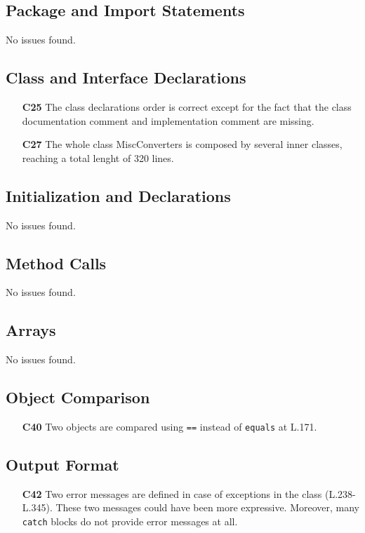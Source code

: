 \subsection{Package and Import Statements}
No issues found.

\subsection{Class and Interface Declarations}
	\begin{itemize}
		\item[\textbf{C25}] The class declarations order is correct except for the fact that the class documentation comment and implementation comment are missing.
		\item[\textbf{C27}] The whole class MiscConverters is composed by several inner classes, reaching a total lenght of 320 lines.
	\end{itemize}

\subsection{Initialization and Declarations}
No issues found.

\subsection{Method Calls}
No issues found.

\subsection{Arrays}
No issues found.

\subsection{Object Comparison}
	\begin{itemize}
		\item[\textbf{C40}] Two objects are compared using \texttt{==} instead of \texttt{equals} at L.171.
	\end{itemize}

\subsection{Output Format}
	\begin{itemize}
		\item[\textbf{C42}] Two error messages are defined in case of exceptions in the class (L.238-L.345). These two messages could have been more expressive. Moreover, many \texttt{catch} blocks do not provide error messages at all.
	\end{itemize}

